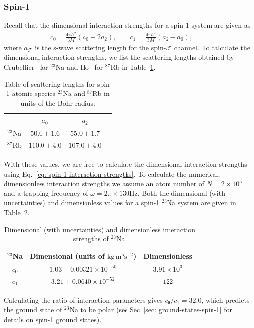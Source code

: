 \subsubsection{Spin-1}
Recall that the dimensional interaction strengths for a spin-1 system are given
as
\begin{align}\label{eq: spin-1-interaction-strengths}
    c_0 = \frac{4\pi\hbar^2}{3M}(a_0+2a_2), \qquad
    c_1 = \frac{4\pi\hbar^2}{3M}(a_2-a_0), \qquad
\end{align}
where \(a_\mathcal{F}\) is the s-wave scattering length for the
spin-\(\mathcal{F}\) channel.
To calculate the dimensional interaction strengths, we list the scattering
lengths obtained by Crubellier~\cite{Crubellier1999} for \( ^{23}\)Na and
Ho~\cite{Ho1998} for \( ^{87}\)Rb in
Table~\ref{table: scaterring-lengths-spin-1}.
\begin{table}[htbp]
    \centering
    \begin{tabular}{ cccc } 
     \toprule
      & \(a_0\) & \(a_2\) \\
      \midrule
      \( ^{23}\)Na & \(50.0\pm 1.6\) & \(55.0\pm 1.7\) \\ 
      \( ^{87}\)Rb & \(110.0\pm 4.0\) & \(107.0\pm 4.0\) \\
      \bottomrule
    \end{tabular}
    \caption[Scattering lengths for spin-1 atomic species \( ^{23}\)Na and
    \( ^{87}\)Rb]{\label{table: scaterring-lengths-spin-1}Table of scattering
    lengths for spin-1 atomic species \( ^{23}\)Na and \( ^{87}\)Rb in units of
    the Bohr radius.}
\end{table}
With these values, we are free to calculate the dimensional interaction
strengths using Eq.~\eqref{eq: spin-1-interaction-strengths}.
To calculate the numerical, dimensionless interaction strengths we assume an
atom number of \(N = 2\times10^5\) and a trapping frequency of
\(\omega = 2\pi \times 130\)Hz.
Both the dimensional (with uncertainties) and dimensionless values for a spin-1
\( ^{23}\)Na system are given in Table~\ref{table: spin-1-interactions-sodium}.
\begin{table}[!htbp]
    \centering
    \begin{tabular}{ccc}
        \toprule
        \( ^{23}\)Na & Dimensional (units of \(\text{kg}\, \text{m}^5
        \text{s}^{-2}\)) & Dimensionless \\
        \midrule
        \(c_0\) & \(1.03 \pm 0.00321 \times 10^{-50}\) & \(3.91\times10^3\) \\
        \(c_1\) & \(3.21 \pm 0.0640 \times 10^{-52}\) & \(122\) \\
        \bottomrule
    \end{tabular}
    \caption{\label{table: spin-1-interactions-sodium}Dimensional (with
    uncertainties) and dimensionless interaction strengths of \( ^{23}\)Na.}
\end{table}
Calculating the ratio of interaction parameters gives \(c_0/c_1=32.0 \),
which predicts the ground state of \( ^{23}\)Na to be polar (see
Sec~\ref{sec: ground-states-spin-1} for details on spin-1 ground states).

